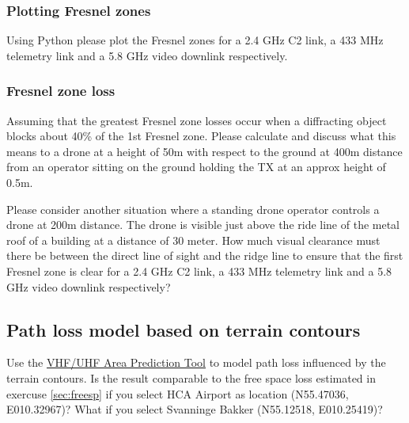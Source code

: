 \documentclass[paper=letter, fontsize=10pt]{article}
\begin{document}
\subsubsection{Plotting Fresnel zones}
Using Python please plot the Fresnel zones for a 2.4 GHz C2 link, a 433 MHz telemetry link and a 5.8 GHz video downlink respectively. 

\subsubsection{Fresnel zone loss}
Assuming that the greatest Fresnel zone losses occur when a diffracting object blocks about 40\% of the 1st Fresnel zone. Please calculate and discuss what this means to a drone at a height of 50m with respect to the ground at 400m distance from an operator sitting on the ground holding the TX at an approx height of 0.5m.

Please consider another situation where a standing drone operator controls a drone at 200m distance. The drone is visible just above the ride line of the metal roof of a building at a distance of 30 meter. How much visual clearance must there be between the direct line of sight and the ridge line to ensure that the first Fresnel zone is clear for a 2.4 GHz C2 link, a 433 MHz telemetry link and a 5.8 GHz video downlink respectively?


\subsection{Path loss model based on terrain contours}

Use the \href{http://www.sws.bom.gov.au/Category/HF\%20Systems/Online\%20Tools/Prediction\%20Tools/VUHF/VUHF.php}{VHF/UHF Area Prediction Tool} to model path loss influenced by the terrain contours. Is the result comparable to the free space loss estimated in exercuse \ref{sec:freesp} if you select HCA Airport as location (N55.47036, E010.32967)? What if you select Svanninge Bakker (N55.12518, E010.25419)?




\end{document}
